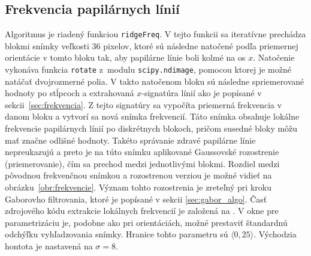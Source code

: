   \subsection{Frekvencia papilárnych línií}
  Algoritmus je riadený funkciou \texttt{ridgeFreq}. V tejto funkcii sa iteratívne prechádza blokmi snímky veľkosti 36 pixelov, ktoré sú následne natočené
  podľa priemernej orientácie v tomto bloku tak, aby papilárne línie boli kolmé na os $x$. Natočenie vykonáva funkcia \texttt{rotate} z~modulu
  \texttt{scipy.ndimage}, pomocou ktorej je možné natáčať dvojrozmerné polia. V takto natočenom bloku sú následne spriemerované hodnoty po stĺpcoch
  a extrahovaná $x$-signatúra línií ako je popísané v sekcii~{\ref{sec:frekvencia}}. Z tejto signatúry sa vypočíta priemerná frekvencia v danom bloku a vytvorí
  sa nová snímka frekvencií. Táto snímka
  obsahuje lokálne frekvencie papilárnych línií po diskrétnych blokoch, pričom susedné bloky môžu mať značne odlišné hodnoty. Takéto správanie zdravé papilárne
  línie nepreukazujú a preto je na túto snímku aplikované Gaussovské rozostrenie (priemerovanie), čím sa  prechod medzi jednotlivými blokmi.
  Rozdiel medzi pôvodnou frekvenčnou snímkou a rozostrenou verziou je možné vidieť na obrázku~{\ref{obr:frekvencie}}. Význam tohto rozostrenia je zreteľný pri
  kroku Gaborovho filtrovania, ktoré je popísané v sekcii \ref{sec:gabor_algo}.
  Časť zdrojového kódu extrakcie lokálnych frekvencií je založená na \cite{KovesiMATLABCode}.
  V okne pre parametrizáciu je, podobne ako pri orientáciách, možné prestaviť štandardnú odchýľku vyhľadzovania snímky. Hranice tohto parametru sú
  $\langle{}0,25\rangle{}$.
  Východzia hontota je nastavená na $\sigma = 8$.

